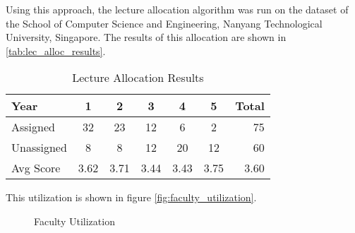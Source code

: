 Using this approach, the lecture allocation algorithm was run on the dataset of the School of Computer Science and Engineering, Nanyang Technological University, Singapore. The results of this allocation are shown in \autoref{tab:lec_alloc_results}.

\begin{table}[H]
  \centering
  \begin{tabular}{|l|c|c|c|c|c|r|}
    \hline
    \textbf{Year} & \textbf{1} & \textbf{2} & \textbf{3} & \textbf{4} & \textbf{5} & \textbf{Total} \\ \hline
    Assigned      & 32         & 23         & 12         & 6          & 2          & 75             \\ \hline
    Unassigned    & 8          & 8          & 12         & 20         & 12         & 60             \\ \hline
    Avg Score     & 3.62       & 3.71       & 3.44       & 3.43       & 3.75       & 3.60           \\ \hline
  \end{tabular}
  \caption{Lecture Allocation Results}
  \label{tab:lec_alloc_results}
\end{table}

This utilization is shown in figure \autoref{fig:faculty_utilization}.

\begin{figure}[H]
  \centering
  \caption{Faculty Utilization}
  \label{fig:faculty_utilization}
\end{figure}



